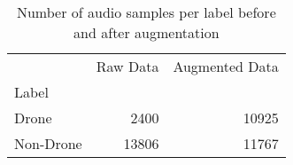 \begin{table}
\caption{Number of audio samples per label before and after augmentation}
\label{tab:audio_label_counts}
\begin{tabular}{lrr}
\toprule
 & Raw Data & Augmented Data \\
Label &  &  \\
\midrule
Drone & 2400 & 10925 \\
Non-Drone & 13806 & 11767 \\
\bottomrule
\end{tabular}
\end{table}
